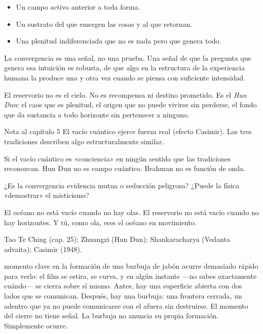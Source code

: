 \begin{itemize}
\item Un campo activo anterior a toda forma.
\item Un sustrato del que emergen las cosas y al que retornan.
\item Una plenitud indiferenciada que no es nada pero que genera todo.
\end{itemize}
La convergencia es una señal, no una prueba. Una señal de que la pregunta que genera esa intuición es robusta, de que algo en la estructura de la experiencia humana la produce una y otra vez cuando se piensa con suficiente intensidad.

El reservorio no es el cielo. No es recompensa ni destino prometido. Es el \emph{Hun Dun}: el caos que es plenitud, el origen que no puede vivirse sin perderse, el fondo que da sustancia a todo horizonte sin pertenecer a ninguno.

\begin{notacap}{Nota al capítulo 5}
 El vacío cuántico ejerce fuerza real (efecto Casimir). Las tres tradiciones describen algo estructuralmente similar.

 Si el vacío cuántico es «conciencia» en ningún sentido que las tradiciones reconozcan. Hun Dun no es campo cuántico. Brahman no es función de onda.

 ¿Es la convergencia evidencia mutua o seducción peligrosa? ¿Puede la física «demostrar» el misticismo?

 El océano no está vacío cuando no hay olas. El reservorio no está vacío cuando no hay horizontes. Y tú, como ola, eres el océano en movimiento.

 Tao Te Ching (cap. 25); Zhuangzi (Hun Dun); Shankaracharya (Vedanta advaita); Casimir (1948).
\end{notacap}
\noindent {} momento clave en la formación de una burbuja de jabón ocurre demasiado rápido para verlo: el film se estira, se curva, y en algún instante —no sabes exactamente cuándo— se cierra sobre sí mismo. Antes, hay una superficie abierta con dos lados que se comunican. Después, hay una burbuja: una frontera cerrada, un adentro que ya no puede comunicarse con el afuera sin destruirse. El momento del cierre no tiene señal. La burbuja no anuncia su propia formación. Simplemente ocurre.

